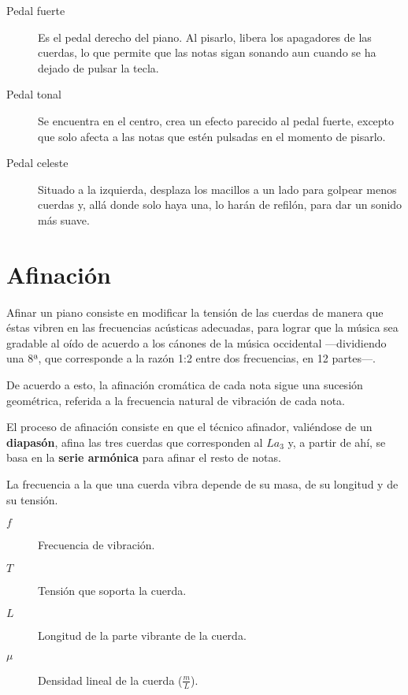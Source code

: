 \documentclass[10pt,a4paper]{article}
\begin{document}
	\begin{description}
		\item[Pedal fuerte] Es el pedal derecho del piano. Al pisarlo, libera 
		los apagadores de las cuerdas, lo que permite que las notas sigan 
		sonando aun cuando se ha dejado de pulsar la tecla.
		
		\item[Pedal tonal] Se encuentra en el centro, crea un efecto parecido 
		al pedal fuerte, excepto que solo afecta a las notas que estén pulsadas 
		en el momento de pisarlo.
		
		\item[Pedal celeste] Situado a la izquierda, desplaza los macillos a un 
		lado para golpear menos cuerdas y, allá donde solo haya una, lo harán 
		de refilón, para dar un sonido más suave.
	\end{description}
	
	
	\clearpage
	\section{Afinación}
	
	Afinar un piano consiste en modificar la tensión de las cuerdas de manera 
	que éstas vibren en las frecuencias acústicas adecuadas, para lograr que la 
	música sea gradable al oído de acuerdo a los cánones de la música 
	occidental ---dividiendo una 8ª, que corresponde a la razón 1:2 entre dos 
	frecuencias, en 12 partes---.
	
	De acuerdo a esto, la afinación cromática de cada nota sigue una sucesión 
	geométrica, referida a la frecuencia natural de vibración de cada nota.
	
	El proceso de afinación consiste en que el técnico afinador, valiéndose de 
	un \textbf{diapasón}, afina las tres cuerdas que corresponden al $La_3$ y, 
	a partir de ahí, se basa en la \textbf{serie armónica} para afinar el resto 
	de notas.
	
	La frecuencia a la que una cuerda vibra depende de su masa, de su longitud 
	y de su tensión.
	
	\begin{description}
		\item[$f$] Frecuencia de vibración.
		\item[$T$] Tensión que soporta la cuerda.
		\item[$L$] Longitud de la parte vibrante de la cuerda.
		\item[$\mu$] Densidad lineal de la cuerda ($\frac{m}{L}$).
	\end{description}
\end{document}

